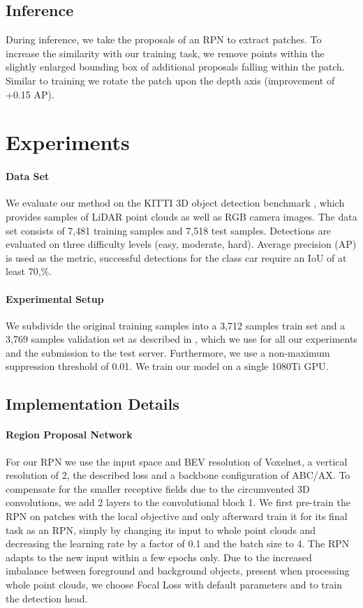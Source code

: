 \documentclass{article}
\begin{document}
\subsection{Inference} \label{sec:inference}
During inference, we take the proposals of an RPN to extract patches. To increase the similarity with our training task, we remove points within the slightly enlarged bounding box of additional proposals falling within the patch. Similar to training we rotate the patch upon the depth axis (improvement of +0.15 AP).

 \section{Experiments}
 \paragraph{Data Set}
We evaluate our method on the KITTI 3D object detection benchmark \cite{Geiger2012kitti}, which provides samples of LiDAR point clouds as well as RGB camera images. 
The data set consists of 7,481 training samples and 7,518 test samples. 
Detections are evaluated on three difficulty levels (easy, moderate, hard). 
Average precision (AP) is used as the metric, successful detections for the class car require an IoU of at least 70,\%. 

\paragraph{Experimental Setup}
We subdivide the original training samples into a 3,712 samples train set and a 3,769 samples validation set as described in \cite{Chen2015objprop}, which we use for all our experiments and the submission to the test server. Furthermore, we use a non-maximum suppression threshold of 0.01. We train our model on a single 1080Ti GPU.

\subsection{Implementation Details}

\paragraph{Region Proposal Network} For our RPN we use the input space and BEV resolution of Voxelnet, a vertical resolution of 2, the described loss and a backbone configuration of ABC/AX. To compensate for the smaller receptive fields due to the circumvented 3D convolutions, we add 2 layers to the convolutional block 1. We first pre-train the RPN on patches with the local objective and only afterward train it for its final task as an RPN, simply by changing its input to whole point clouds and decreasing the learning rate by a factor of 0.1 and the batch size to 4. The RPN adapts to the new input within a few epochs only. Due to the increased imbalance between foreground and background objects, present when processing whole point clouds, we choose Focal Loss \cite{Lin2017focal} with default parameters  and  to train the detection head. 
\end{document}
